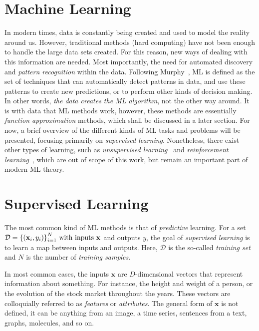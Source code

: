 \section{Machine Learning}
In modern times, data is constantly being created and used to model the reality around us.
However, traditional methods (hard computing) have not been enough to handle the large
data sets created. For this reason, new ways of dealing with this information are needed. 
Most importantly, the need for automated discovery and \emph{pattern recognition} within the
data. Following Murphy~\cite{murphyMachineLearningProbabilistic2012}, ML 
is defined as the set of techniques that can automatically detect patterns in data, and use 
these patterns to create new predictions, or to perform other kinds of decision making.
In other words, \emph{the data creates the ML algorithm}, not the other way around.
It is with data that ML methods work, however, these methods are essentially
\emph{function approximation} methods, which shall be discussed in a later section.
For now, a brief overview of the different kinds of ML tasks and problems will be presented,
focusing primarily on \emph{supervised learning}. Nonetheless, there exist other types
of learning, such as \emph{unsupervised learning}~\cite{goodfellowDeepLearning2016,hastieElementsStatisticalLearning2009} and \emph{reinforcement learning}~\cite{suttonReinforcementLearningSecond2018,kaelblingReinforcementLearningSurvey1996},
which are out of scope of this work, but remain an important part of modern ML theory.

\section{Supervised Learning}
The most common kind of ML methods is that of \emph{predictive} learning. For a set 
\(\mathcal{D}={ \{(\mathbf{x}_{i}, y_i)\} }_{i=1}^{N}$ with inputs $\mathbf{x}\)
and outputs $y$, the goal of \emph{supervised learning} is to learn a map between
inputs and outputs. Here, $\mathcal{D}$ is the so-called \emph{training set} and $N$
is the number of \emph{training samples}.

In most common cases, the inputs $\mathbf{x}$ are $D$-dimensional vectors that
represent information about something. For instance, the height and weight of a
person, or the evolution of the stock market throughout the years. 
These vectors are colloquially referred to as \emph{features} or \emph{attributes}.
The general form of $\mathbf{x}$ is not defined, it can be anything from an image, a time 
series, sentences from a text, graphs, molecules, and so on.

